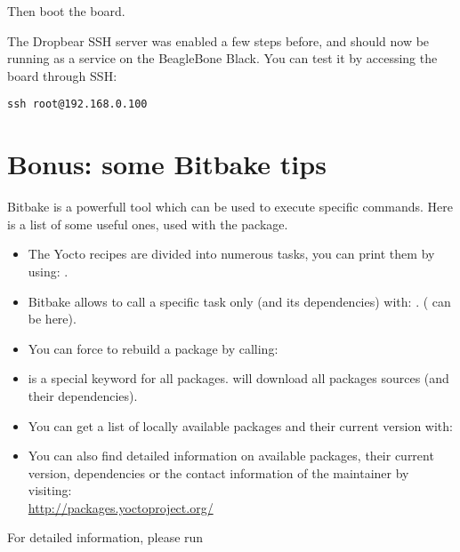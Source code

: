 Then boot the board.

The Dropbear SSH server was enabled a few steps before, and should now be
running as a service on the BeagleBone Black. You can test it by accessing the
board through SSH:
\begin{verbatim}
ssh root@192.168.0.100
\end{verbatim}

\section{Bonus: some Bitbake tips}

Bitbake is a powerfull tool which can be used to execute specific commands. Here
is a list of some useful ones, used with the  package.

\begin{itemize}
  \item The Yocto recipes are divided into numerous tasks, you can print them
        by using: .
  \item Bitbake allows to call a specific task only (and its dependencies)
        with: . ( can be
	 here).
  \item You can force to rebuild a package by calling: 
  \item {} is a special keyword for all packages.  will download all packages sources (and their
        dependencies).
  \item You can get a list of locally available packages and their current
        version with: \\
  \item You can also find detailed information on available packages, their
        current version, dependencies or the contact information of the
	maintainer by visiting: \\
	\url{http://packages.yoctoproject.org/}
\end{itemize}

For detailed information, please run 
